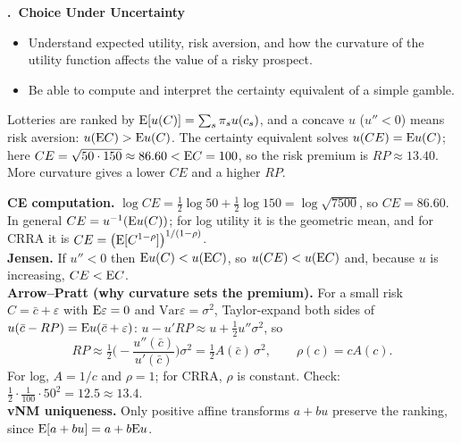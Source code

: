\documentclass[11pt]{article}
\newcounter{qn}
\newcommand{\question}[1]{\par\needspace{14\baselineskip}\refstepcounter{qn}\medskip
{\bfseries\color{ink}\large \theqn.\ #1}\par\smallskip}
\newcommand{\Var}{\mathrm{Var}}
\begin{document}
\question{Choice Under Uncertainty}
\begin{itemize}[leftmargin=1.2em,itemsep=0pt]\itshape
\item Understand expected utility, risk aversion, and how the curvature of the utility function affects the value of a risky prospect.
\item Be able to compute and interpret the certainty equivalent of a simple gamble.
\end{itemize}

\begin{resp}
\begin{minipage}[t]{0.62\textwidth}\vspace{0pt}
Lotteries are ranked by $\mathrm{E}[u(C)]=\sum_s\pi_su(c_s)$, and a concave $u$ ($u''<0$) means risk aversion: $u(\mathrm{E} C)>\mathrm{E} u(C)$. The certainty equivalent solves $u(CE)=\mathrm{E} u(C)$; here $CE=\sqrt{50\cdot150}\approx86.60<\mathrm{E} C=100$, so the risk premium is $RP\approx13.40$. More curvature gives a lower $CE$ and a higher $RP$.
\end{minipage}\hfill
\begin{minipage}[t]{0.34\textwidth}\vspace{0pt}\centering
\scalebox{0.75}{\figCE}
\end{minipage}
\end{resp}
\begin{intu}
\textbf{CE computation.} $\log CE=\tfrac12\log50+\tfrac12\log150=\log\sqrt{7500}$, so $CE=86.60$. In general $CE=u^{-1}(\mathrm{E} u(C))$; for log utility it is the geometric mean, and for CRRA it is $CE=\big(\mathrm{E}[C^{1-\rho}]\big)^{1/(1-\rho)}$.\\
\textbf{Jensen.} If $u''<0$ then $\mathrm{E} u(C)<u(\mathrm{E} C)$, so $u(CE)<u(\mathrm{E} C)$ and, because $u$ is increasing, $CE<\mathrm{E} C$.\\
\textbf{Arrow--Pratt (why curvature sets the premium).} For a small risk $C=\bar c+\varepsilon$ with $\mathrm{E}\varepsilon=0$ and $\Var\varepsilon=\sigma^2$, Taylor-expand both sides of $u(\bar c-RP)=\mathrm{E} u(\bar c+\varepsilon)$: $u-u'RP\approx u+\tfrac12u''\sigma^2$, so
\[RP\approx\tfrac12\Big(-\frac{u''(\bar c)}{u'(\bar c)}\Big)\sigma^2=\tfrac12A(\bar c)\,\sigma^2,\qquad \rho(c)=cA(c).\]
For log, $A=1/c$ and $\rho=1$; for CRRA, $\rho$ is constant. Check: $\tfrac12\cdot\tfrac1{100}\cdot50^2=12.5\approx13.4$.\\
\textbf{vNM uniqueness.} Only positive affine transforms $a+bu$ preserve the ranking, since $\mathrm{E}[a+bu]=a+b\mathrm{E} u$.
\end{intu}
\end{document}
